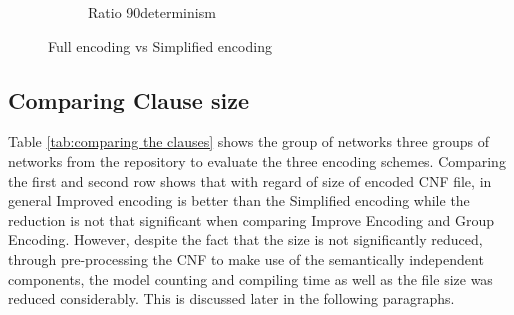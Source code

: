 \begin{figure}[h]
\begin{subfigure}{0.32\textwidth}
\caption{Ratio 90determinism}
\label{fig: r90_determin}
\end{subfigure}
 
\caption{Full encoding vs Simplified encoding}
\label{fig:determinism}
\end{figure}

\subsection{Comparing Clause size}
Table \ref{tab:comparing the clauses} shows the group of networks three groups of networks from the repository to evaluate the three encoding schemes. Comparing the first and second row shows that with regard of size of encoded CNF file, in general Improved encoding is better than the Simplified encoding while the reduction is not that significant when comparing Improve Encoding and Group Encoding. However, despite the fact that the size is not significantly reduced, through pre-processing the CNF to make use of the semantically independent components, the model counting and compiling time as well as the file size was reduced considerably. This is discussed later in the following paragraphs.

